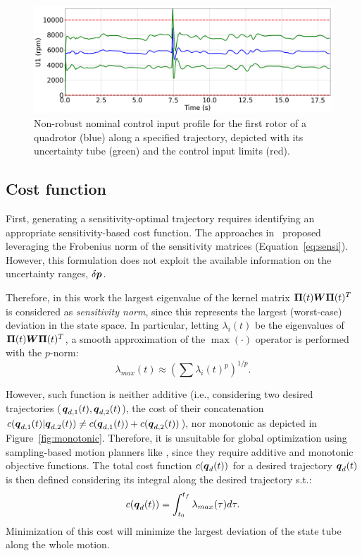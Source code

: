 \begin{figure} [htp]
    \centering
    \includegraphics[width=0.8\linewidth]{figures/samp/Invalid_Inputs.png} 
    \caption{Non-robust nominal control input profile for the first rotor of a quadrotor (blue) along a specified trajectory, depicted with its uncertainty tube (green) and the control input limits (red).}%
    \label{fig:invalid_inputs}%
\end{figure}

\subsection{Cost function}\label{sec:sensi_cost}

First, generating a sensitivity-optimal trajectory requires identifying an appropriate sensitivity-based cost function.
The approaches in~\cite{cPi, cTh} proposed leveraging the Frobenius norm of the sensitivity matrices (Equation~\ref{eq:sensi}).
However, this formulation does not exploit the available information on the uncertainty ranges, $\delta \boldsymbol{p}$.

Therefore, in this work the largest eigenvalue of the kernel matrix $\boldsymbol{\Pi}(t) \boldsymbol{W} \boldsymbol{\Pi}(t)^T$ is considered as \emph{sensitivity norm}, since this represents the largest (worst-case) deviation in the state space. 
In particular, letting $\lambda_i(t)$ be the eigenvalues of $\boldsymbol{\Pi}(t) \boldsymbol{W} \boldsymbol{\Pi}(t)^T$, a smooth approximation of the $\max(\cdot)$ operator is performed with the $p$-norm:
\begin{equation}
    \lambda_{max}(t)\approx \left(\sum \lambda_{i}(t)^p\right)^{1/p}.
\end{equation} 

However, such function is neither additive (i.e., considering two desired trajectories ($\boldsymbol{q}_{d,1}(t), \boldsymbol{q}_{d,2}(t)$), the cost of their concatenation $c(\boldsymbol{q}_{d,1}(t)|\boldsymbol{q}_{d,2}(t)) \neq c(\boldsymbol{q}_{d,1}(t)) + c(\boldsymbol{q}_{d,2}(t))$), nor monotonic as depicted in Figure~\ref{fig:monotonic}.
Therefore, it is unsuitable for global optimization using sampling-based motion planners like \cite{cRRTstar, cSST}, since they require additive and monotonic objective functions.
The total cost function $c(\boldsymbol{q}_d(t))$ for a desired trajectory $\boldsymbol{q}_d(t)$ is then defined considering its integral along the desired trajectory s.t.:
\begin{equation} \label{eq:cost_function}
    c(\boldsymbol{q}_d(t))=\int_{t_{0}}^{t_{f}}\lambda_{max}(\tau)d\tau.
\end{equation}
Minimization of this cost will minimize the largest deviation of the state tube along the whole motion.

